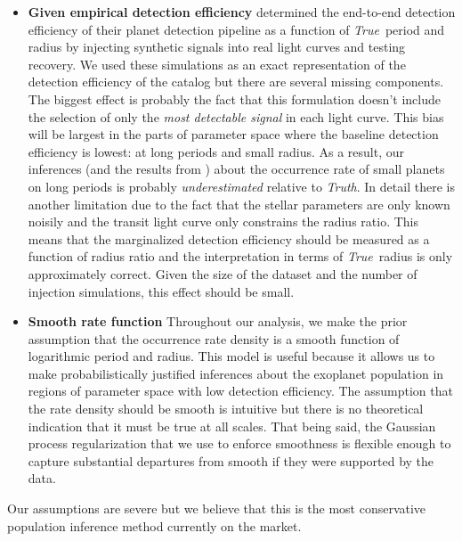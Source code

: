 \documentclass[12pt,preprint]{aastex}
\newcommand{\foreign}[1]{\emph{#1}}
\newcommand{\True}{\foreign{True}}
\newcommand{\Truth}{\foreign{Truth}}
\begin{document}
\begin{itemize}
\item {\bf Given empirical detection efficiency}\quad
\citet{petigura} determined the end-to-end detection efficiency of their
planet detection pipeline as a function of \True\ period and radius by
injecting synthetic signals into real light curves and testing recovery.
We used these simulations as an exact representation of the detection
efficiency of the catalog but there are several missing components.
The biggest effect is probably the fact that this formulation doesn't include
the selection of only the \emph{most detectable signal} in each light curve.
This bias will be largest in the parts of parameter space where the baseline
detection efficiency is lowest: at long periods and small radius.
As a result, our inferences (and the results from \citealt{petigura}) about
the occurrence rate of small planets on long periods is probably
\emph{underestimated} relative to \Truth.
In detail there is another limitation due to the fact that the stellar
parameters are only known noisily and the transit light curve only constrains
the radius ratio.
This means that the marginalized detection efficiency should be measured as a
function of radius ratio and the interpretation in terms of \True\ radius is
only approximately correct.
Given the size of the dataset and the number of injection simulations, this
effect should be small.

\item {\bf Smooth rate function}\quad
Throughout our analysis, we make the prior assumption that the occurrence rate
density is a smooth function of logarithmic period and radius.
This model is useful because it allows us to make probabilistically justified
inferences about the exoplanet population in regions of parameter space with
low detection efficiency.
The assumption that the rate density should be smooth is intuitive but there
is no theoretical indication that it must be true at all scales.
That being said, the Gaussian process regularization that we use to enforce
smoothness is flexible enough to capture substantial departures from smooth if
they were supported by the data.

\end{itemize}
Our assumptions are severe but we believe that this is the most conservative
population inference method currently on the market.
\end{document}
